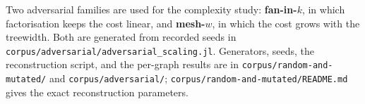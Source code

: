 \documentclass[12pt]{report}
\providecommand{\filepath}[1]{\nolinkurl{#1}}
\begin{document}
Two adversarial families are used for the complexity study: \textbf{fan-in-$k$}, in which
factorisation keeps the cost linear, and \textbf{mesh-$w$}, in which the cost grows with
the treewidth. Both are generated from recorded seeds in
\filepath{corpus/adversarial/adversarial\_scaling.jl}. Generators, seeds, the reconstruction
script, and the per-graph results are in \filepath{corpus/random-and-mutated/} and
\filepath{corpus/adversarial/}; \filepath{corpus/random-and-mutated/README.md} gives the exact
reconstruction parameters.

\ifdefined\maindoc
\else
\printbibliography
\end{document}
